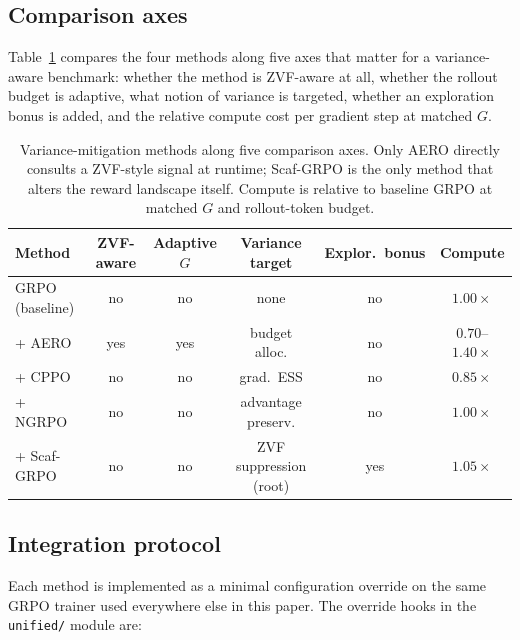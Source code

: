 \subsection{Comparison axes}
\label{sec:variance-comparison-axes}

Table~\ref{tab:variance-axes} compares the four methods along five
axes that matter for a variance-aware benchmark: whether the method
is ZVF-aware at all, whether the rollout budget is adaptive, what
notion of variance is targeted, whether an exploration bonus is added,
and the relative compute cost per gradient step at matched $G$.

\begin{table}[t]
  \centering
  \small
  \setlength{\tabcolsep}{4pt}
  \begin{tabular}{lccccc}
    \toprule
    \textbf{Method} &
    \textbf{ZVF-aware} &
    \textbf{Adaptive $G$} &
    \textbf{Variance target} &
    \textbf{Explor.\ bonus} &
    \textbf{Compute} \\
    \midrule
    GRPO (baseline)      & no  & no  & none                    & no  & $1.00\times$ \\
    + AERO~\cite{aero2024}       & yes & yes & budget alloc.           & no  & $0.70$--$1.40\times$ \\
    + CPPO~\cite{cppo2024}       & no  & no  & grad.\ ESS              & no  & $0.85\times$ \\
    + NGRPO~\cite{ngrpo2025}     & no  & no  & advantage preserv.      & no  & $1.00\times$ \\
    + Scaf-GRPO~\cite{scafgrpo2025} & no  & no  & ZVF suppression (root) & yes & $1.05\times$ \\
    \bottomrule
  \end{tabular}
  \caption{Variance-mitigation methods along five comparison axes.
  Only AERO directly consults a ZVF-style signal at runtime; Scaf-GRPO
  is the only method that alters the reward landscape itself.
  Compute is relative to baseline GRPO at matched $G$ and
  rollout-token budget.}
  \label{tab:variance-axes}
\end{table}

\subsection{Integration protocol}
\label{sec:variance-integration}

Each method is implemented as a minimal configuration override on the
same GRPO trainer used everywhere else in this paper. The override
hooks in the \texttt{unified/} module are:

